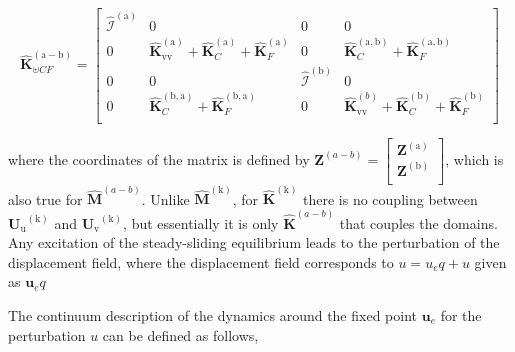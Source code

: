   \begin{equation}
 \mathbf{\hat{K}}^{\mathrm{(a-b)}}_{\uplus CF}=
 \left[
\begin{array}{cccc}
  \mathcal{\hat I}^{(\mathrm a)} &0&0&0\\
  0&\mathbf{\hat{K}}_{\mathrm{vv}}^{(\mathrm a)}+ {{\mathbf{\hat K}}}^{\mathrm{(\mathrm a)}}_C+ {{\mathbf{\hat K}}}^{\mathrm{(a)}}_F&0&{{\mathbf{\hat K}}}^{\mathrm{(a,b)}}_C+{{\mathbf{\hat K}}}^{\mathrm{(a,b)}}_F \\
  0&0& \mathcal{\hat I}^{(\mathrm b)} &0 \\
  0& {{\mathbf{\hat K}}}^{\mathrm{(b,a)}}_C+{{\mathbf{\hat K}}}^{\mathrm{(b,a)}}_F&0&\mathbf{\hat{K}}_{\mathrm{vv}}^{(b)}+ {{\mathbf{\hat K}}}^{\mathrm{(b)}}_C+ {{\mathbf{\hat K}}}^{\mathrm{(b)}}_F \\
\end{array}
\right] 
 \end{equation}
 
 where the coordinates of the matrix is defined by $\mathbf{Z}^{(a-b)} = \left[\begin{array}{cc}
 \mathbf{Z}^{(\mathrm a)}  \\
  \mathbf{Z}^{(\mathrm b)}  \\
\end{array}\right]$, which is also true for $\mathbf{\hat{M}}^{(a-b)}$.
Unlike $\mathbf{\hat{M}}^{(\mathrm k)}$, for $\mathbf{\hat{K}}^{(\mathrm k)}$ there is no coupling between ${\bm U_{\mathrm u}}^{(\mathrm k)}$ and ${\bm U_{\mathrm v}}^{(\mathrm k)}$, but essentially it is only $\mathbf{\hat{K}}^{(a-b)}$ that couples the domains. \\ 
 
 
 
 
 









\iffalse
Any excitation of the steady-sliding equilibrium leads to the perturbation of the displacement field, where the displacement field corresponds to $u =u_eq+{u}$ given as $\bm{u}_eq$  



The continuum description of the dynamics around the fixed point $\bm{u}_e$ for the perturbation $u$ can be defined as follows,

